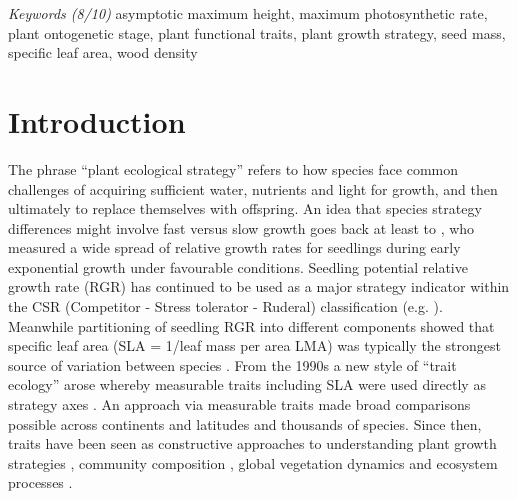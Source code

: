 \documentclass[a4paper]{article}\usepackage[]{graphicx}\usepackage[]{color}
\begin{document}
\textit{Keywords (8/10)} asymptotic maximum height, maximum photosynthetic rate, plant ontogenetic stage, plant functional traits, plant growth strategy, seed mass, specific leaf area, wood density


\clearpage

\section*{Introduction}\label{introduction}

The phrase ``plant ecological strategy'' refers to how species face common challenges of acquiring sufficient water, nutrients and light for growth, and then ultimately to replace themselves with offspring. An idea that species strategy differences might involve fast versus slow growth goes back at least to \citet{Grime:1975gr}, who measured a wide spread of relative growth rates for seedlings during early exponential growth under favourable conditions. Seedling potential relative growth rate (RGR) has continued to be used as a major strategy indicator within the CSR (Competitor - Stress tolerator - Ruderal) classification (e.g. \citealt{grime1979plant, Grime:1997wm}). Meanwhile partitioning of seedling RGR into different components showed that specific leaf area (SLA = 1/leaf mass per area LMA) was typically the strongest source of variation between species \citep{Poorter:1989tx}. From the 1990s a new style of ``trait ecology'' arose whereby measurable traits including SLA were used directly as strategy axes \citep{Westoby:2002ft}. An approach via measurable traits made broad comparisons possible across continents and latitudes and thousands of species. Since then, traits have been seen as constructive approaches to understanding plant growth strategies \citep{Grime:1977kc,Chapin:1980gz}, community composition \citep{Lavorel:2002ff,Shipley:2006ie}, global vegetation dynamics \citep{Scheiter:2013ed} and ecosystem processes \citep{Lavorel:2002ff}.
\end{document}
